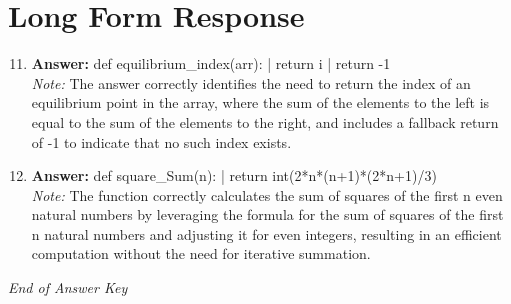\documentclass[12pt]{article}
\begin{document}
\section*{Long Form Response}
\begin{enumerate}[label=\arabic*.]
\setcounter{enumi}{10}
\item \textbf{Answer:} def equilibrium\_index(arr): | return i | return -1
\\ \textit{Note:} The answer correctly identifies the need to return the index of an equilibrium point in the array, where the sum of the elements to the left is equal to the sum of the elements to the right, and includes a fallback return of -1 to indicate that no such index exists.
\item \textbf{Answer:} def square\_Sum(n): | return int(2*n*(n+1)*(2*n+1)/3)
\\ \textit{Note:} The function correctly calculates the sum of squares of the first n even natural numbers by leveraging the formula for the sum of squares of the first n natural numbers and adjusting it for even integers, resulting in an efficient computation without the need for iterative summation.
\end{enumerate}

\vfill
\noindent\textit{End of Answer Key}
\end{document}
